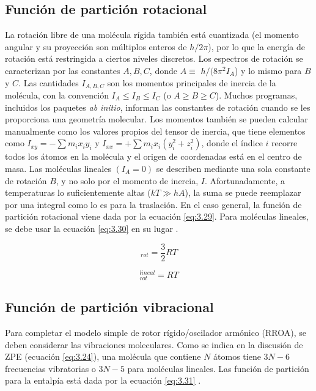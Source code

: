 \newpage

\subsection{Función de partición rotacional}

La rotación libre de una molécula rígida también está cuantizada (el momento angular y su proyección son múltiplos enteros de $h/2\pi$), por lo que la energía de rotación está restringida a ciertos niveles discretos. Los espectros de rotación se caracterizan por las constantes $A, B, C$, donde $A \equiv$ $h/(8\pi^{2}I_{A}$) y lo mismo para $B$ y $C$. Las cantidades $I_{A,B,C}$ son los momentos principales de inercia de la molécula, con la convención $I_{A} \leq I_{B} \leq I_{C}$ (o $A \geq B \geq C$). Muchos programas, incluidos los paquetes \textit{ab initio}, informan las constantes de rotación cuando se les proporciona una geometría molecular. Los momentos también se pueden calcular manualmente como los valores propios del tensor de inercia, que tiene elementos como $I_{xy} = - \sum m_{i}x_{i}y_{i}$ y $I_{xx} = + \sum m_{i}x_{i}(y_{i}^{2}+z_{i}^{2})$, donde el índice $i$ recorre todos los átomos en la molécula y el origen de coordenadas está en el centro de masa. Las moléculas lineales $(I_{A} = 0)$ se describen mediante una sola constante de rotación $B$, y no solo por el momento de inercia, $I$. Afortunadamente, a temperaturas lo suficientemente altas ($kT \gg hA$), la suma se puede reemplazar por una integral como lo es para la traslación. En el caso general, la función de partición rotacional viene dada por la ecuación \ref{eq:3.29}. Para moléculas lineales, se debe usar la ecuación \ref{eq:3.30} en su lugar \cite{Irikura1998}.


\begin{equation}
[H(T)-H(0)]_{rot} = \frac{3}{2} RT
\label{eq:3.29}
\end{equation}


\begin{equation}
[H(T)-H(0)]_{rot}^{lineal} =  RT
\label{eq:3.30}
\end{equation}

\newpage

\subsection{Función de partición vibracional}

Para completar el modelo simple de rotor rígido/oscilador armónico (RROA), se deben
considerar las vibraciones moleculares. Como se indica en la discusión de ZPE (ecuación
\ref{eq:3.24}), una molécula que contiene $N$ átomos tiene $3N-6$ frecuencias vibratorias o $3N-5$ para moléculas lineales. Las función de partición para la entalpía está dada por la ecuación \ref{eq:3.31} \cite{Irikura1998}.

